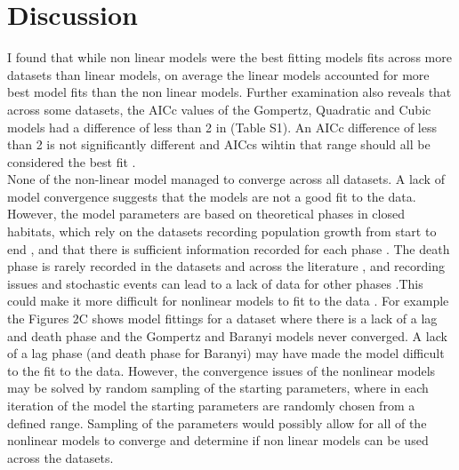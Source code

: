 \documentclass[titlepage]{article}
\begin{document}
  
\section{Discussion}


I found that while non linear models were the best fitting models fits across more datasets than linear models, on average the linear models accounted for more best model fits than the non linear models. Further examination also reveals that across some datasets, the AICc values of the Gompertz, Quadratic and Cubic models had a difference of less than 2 in (Table S1). An AICc difference of less than 2 is not significantly different and AICcs wihtin that range should all be considered the best fit \cite{akaike1998bayesian}.  \\

None of the non-linear model managed to converge across all datasets. A lack of model convergence suggests that the models are not a good fit to the data. However, the model parameters are based on theoretical phases in closed habitats, which rely on the datasets recording population growth from start to end \cite{grijspeerdt1999estimating}, and that there is sufficient information recorded for each phase \cite{buchanan1997simple}. The death phase is rarely recorded in the datasets and across the literature \cite{peleg2011microbial}, and recording issues and stochastic events can lead to a lack of data for other phases \cite{peleg2011microbial,pla2015comparison}.This could make it more difficult for nonlinear models to fit to the data \cite{buchanan1997simple}. For example the Figures 2C shows model fittings for a dataset where there is a lack of a lag and death phase and the Gompertz and Baranyi models never converged. A lack of a lag phase (and death phase for Baranyi) may have made the model difficult to the fit to the data. However, the convergence issues of the nonlinear models may be solved by random sampling of the starting parameters, where in each iteration of the model the starting parameters are randomly chosen from a defined range. Sampling of the parameters would possibly allow for all of the nonlinear models to converge and determine if non linear models can be used across the datasets. \\
 
\end{document}
